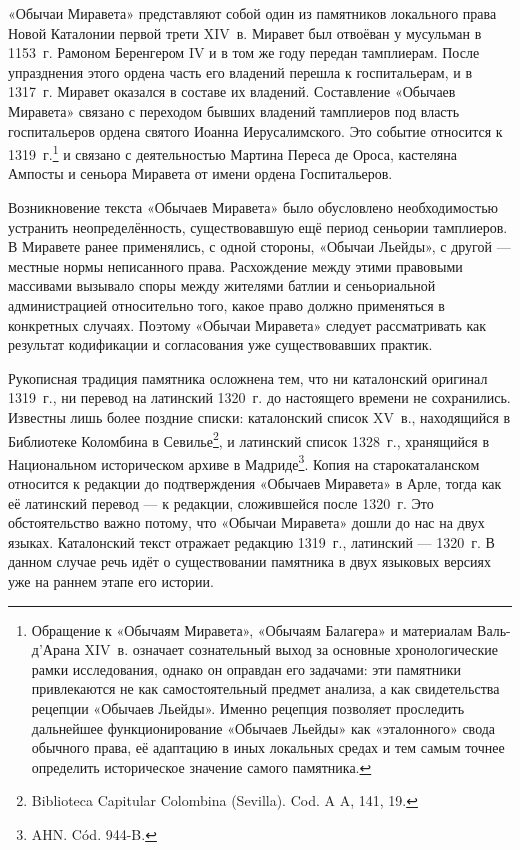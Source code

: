 «Обычаи Миравета» представляют собой один из памятников локального права Новой Каталонии первой трети XIV~в. Миравет был отвоёван у мусульман в 1153~г. Рамоном Беренгером IV и в том же году передан тамплиерам. После упразднения этого ордена часть его владений перешла к госпитальерам, и в 1317~г. Миравет оказался в составе их владений. Составление «Обычаев Миравета» связано с переходом бывших владений тамплиеров под власть госпитальеров ордена святого Иоанна Иерусалимского. Это событие относится к 1319~г.\footnote{Обращение к «Обычаям Миравета», «Обычаям Балагера» и материалам Валь-д’Арана XIV~в. означает сознательный выход за основные хронологические рамки исследования, однако он оправдан его задачами: эти памятники привлекаются не как самостоятельный предмет анализа, а как свидетельства рецепции «Обычаев Льейды». Именно рецепция позволяет проследить дальнейшее функционирование «Обычаев Льейды» как «эталонного» свода обычного права, её адаптацию в иных локальных средах и тем самым точнее определить историческое значение самого памятника.} и связано с деятельностью Мартина Переса де Ороса, кастеляна Ампосты и сеньора Миравета от имени ордена Госпитальеров.

Возникновение текста «Обычаев Миравета» было обусловлено необходимостью устранить неопределённость, существовавшую ещё период сеньории тамплиеров. В Миравете ранее применялись, с одной стороны, «Обычаи Льейды», с другой --- местные нормы неписанного права. Расхождение между этими правовыми массивами вызывало споры между жителями батлии и сеньориальной администрацией относительно того, какое право должно применяться в конкретных случаях. Поэтому «Обычаи Миравета» следует рассматривать как результат кодификации и согласования уже существовавших практик.

Рукописная традиция памятника осложнена тем, что ни каталонский оригинал 1319~г., ни перевод на латинский 1320~г. до настоящего времени не сохранились. Известны лишь более поздние списки: каталонский список XV~в., находящийся в Библиотеке Коломбина в Севилье\footnote{Biblioteca Capitular Colombina (Sevilla). Cod. A A, 141, 19.}, и латинский список 1328~г., хранящийся в Национальном историческом архиве в Мадриде\footnote{AHN. Cód. 944-B.}. Копия на старокаталанском относится к редакции до подтверждения «Обычаев Миравета» в Арле, тогда как её латинский перевод --- к редакции, сложившейся после 1320~г. Это обстоятельство важно потому, что «Обычаи Миравета» дошли до нас на двух языках. Каталонский текст отражает редакцию 1319~г., латинский --- 1320~г. В данном случае речь идёт о существовании памятника в двух языковых версиях уже на раннем этапе его истории.

